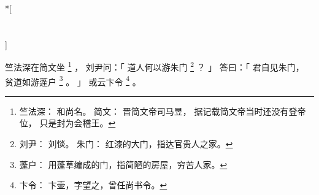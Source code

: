 
\switchcolumn[0]*[\section{}]

竺法深在简文坐%
\footnote{%
    竺法深：
        和尚名。
    简文：
        晋简文帝司马昱，
        据记载简文帝当时还没有登帝位，
        只是封为会稽王。
}%
，
刘尹问：「
    道人何以游朱门%
    \footnote{%
        刘尹：
            刘惔。
        朱门：
            红漆的大门，指达官贵人之家。
    }%
    ？
」
答曰：「
    君自见朱门，
    贫道如游蓬户%
    \footnote{%
        蓬户：
            用蓬草编成的门，指简陋的房屋，穷苦人家。
    }%
    。
」
或云卞令%
\footnote{%
    卞令：
        卞壶，字望之，曾任尚书令。
}%
。

\switchcolumn


